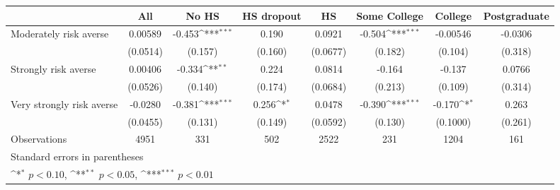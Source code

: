 {
\def\sym#1{\ifmmode^{#1}\else\(^{#1}\)\fi}
\begin{tabular}{l*{7}{c}}
\toprule
                    &\multicolumn{1}{c}{All}&\multicolumn{1}{c}{No HS}&\multicolumn{1}{c}{HS dropout}&\multicolumn{1}{c}{HS}&\multicolumn{1}{c}{Some College}&\multicolumn{1}{c}{College}&\multicolumn{1}{c}{Postgraduate}\\
\midrule
Moderately risk averse&     0.00589         &      -0.453\sym{***}&       0.190         &      0.0921         &      -0.504\sym{***}&    -0.00546         &     -0.0306         \\
                    &    (0.0514)         &     (0.157)         &     (0.160)         &    (0.0677)         &     (0.182)         &     (0.104)         &     (0.318)         \\
\addlinespace
Strongly risk averse&     0.00406         &      -0.334\sym{**} &       0.224         &      0.0814         &      -0.164         &      -0.137         &      0.0766         \\
                    &    (0.0526)         &     (0.140)         &     (0.174)         &    (0.0684)         &     (0.213)         &     (0.109)         &     (0.314)         \\
\addlinespace
Very strongly risk averse&     -0.0280         &      -0.381\sym{***}&       0.256\sym{*}  &      0.0478         &      -0.390\sym{***}&      -0.170\sym{*}  &       0.263         \\
                    &    (0.0455)         &     (0.131)         &     (0.149)         &    (0.0592)         &     (0.130)         &    (0.1000)         &     (0.261)         \\
\midrule
Observations        &        4951         &         331         &         502         &        2522         &         231         &        1204         &         161         \\
\bottomrule
\multicolumn{8}{l}{\footnotesize Standard errors in parentheses}\\
\multicolumn{8}{l}{\footnotesize \sym{*} \(p<0.10\), \sym{**} \(p<0.05\), \sym{***} \(p<0.01\)}\\
\end{tabular}
}
